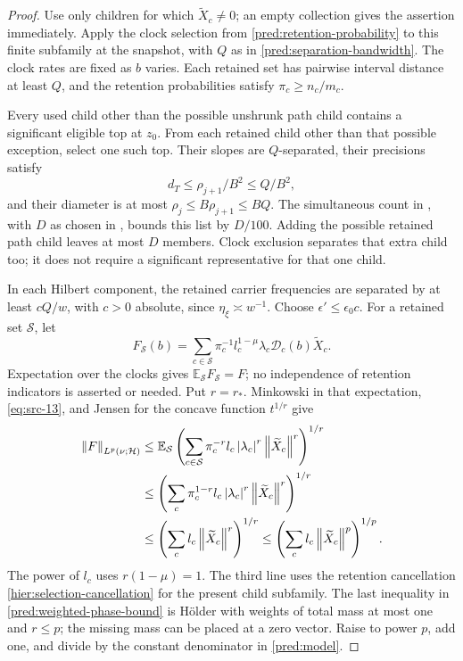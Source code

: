 \begin{proof}
Use only children for which \(\widetilde X_c\ne0\); an empty
collection gives the assertion immediately. Apply the clock selection
from \eqref{pred:retention-probability} to this finite subfamily at the
snapshot, with \(Q\) as in \eqref{pred:separation-bandwidth}. The clock
rates are fixed as \(b\) varies. Each retained set has pairwise interval
distance at least \(Q\), and the retention probabilities satisfy
\(\pi_c\ge n_c/m_c\).

Every used child other than the possible unshrunk path child contains
a significant eligible top at \(z_0\). From each retained child other
than that possible exception, select one such top. Their slopes are
\(Q\)-separated, their
precisions satisfy
\[
 d_T\le\rho_{j+1}/B^2\le Q/B^2,
\]
and their diameter is at most
\(\rho_j\le B\rho_{j+1}\le BQ\).
The simultaneous count in , with \(D\) as
chosen in , bounds this list by \(D/100\).
Adding the possible retained path child leaves at most \(D\) members.
Clock exclusion separates that extra child too; it does not require
a significant representative for that one child.

In each Hilbert component, the retained carrier frequencies are
separated by at least \(c Q/w\), with \(c>0\) absolute, since
\(\eta_\xi\asymp w^{-1}\). Choose \(\epsilon'\le\epsilon_0c\).
For a retained set \(\mathcal S\), let
\[
 F_{\mathcal S}(b)=
     \sum_{c\in\mathcal S}\pi_c^{-1}
       l_c^{1-\mu}\lambda_c\mathcal D_c(b)\widetilde X_c.
\]
Expectation over the clocks gives
\(\mathbb E_{\mathcal S}F_{\mathcal S}=F\); no independence of
retention indicators is asserted or needed. Put \(r=r_*\).
Minkowski in that expectation, \eqref{eq:src-13}, and Jensen for
the concave function \(t^{1/r}\) give
\begin{align}
 \left\|F\right\|_{L^p(\nu;\mathcal H)}
 &\le \mathbb E_{\mathcal S}
       \left(\sum_{c\in\mathcal S}
          \pi_c^{-r}l_c\left|\lambda_c\right|^r
                           \left\|\widetilde X_c\right\|^r\right)^{1/r}
       \notag\\
 &\le\left(\sum_c\pi_c^{1-r}l_c\left|\lambda_c\right|^r
                           \left\|\widetilde X_c\right\|^r\right)^{1/r}
       \notag\\
 &\le\left(\sum_c l_c\left\|\widetilde X_c\right\|^r\right)^{1/r}
 \le\left(\sum_c l_c\left\|\widetilde X_c\right\|^p\right)^{1/p}.
 \label{pred:weighted-phase-bound}
\end{align}
The power of \(l_c\) uses \(r(1-\mu)=1\).
The third line uses the retention cancellation
\eqref{hier:selection-cancellation} for the present child subfamily.
The last inequality in \eqref{pred:weighted-phase-bound} is H\"older
with weights of total mass at most one and \(r\le p\); the missing
mass can be placed at a zero vector. Raise to power \(p\), add one,
and divide by the constant denominator in \eqref{pred:model}.
\end{proof}

